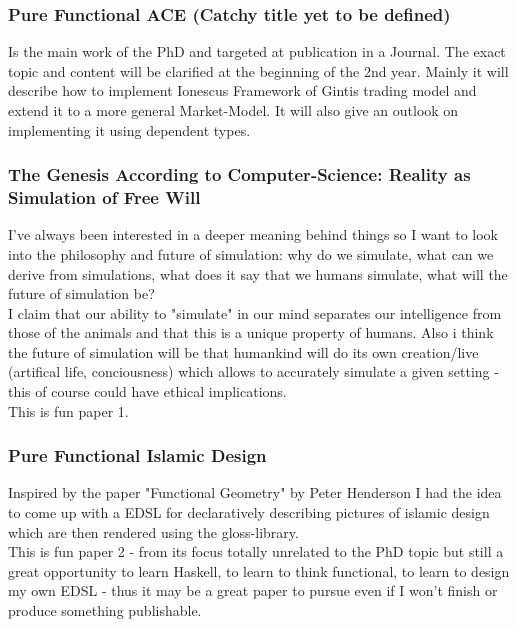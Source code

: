 \subsubsection{Pure Functional ACE (Catchy title yet to be defined)}
Is the main work of the PhD and targeted at publication in a Journal. The exact topic and content will be clarified at the beginning of the 2nd year. Mainly it will describe how to implement Ionescus Framework of Gintis trading model and extend it to a more general Market-Model. It will also give an outlook on implementing it using dependent types.

\subsubsection{The Genesis According to Computer-Science: Reality as Simulation of Free Will}
I've always been interested in a deeper meaning behind things so I want to look into the philosophy and future of simulation: why do we simulate, what can we derive from simulations, what does it say that we humans simulate, what will the future of simulation be? \\
I claim that our ability to "simulate" in our mind separates our intelligence from those of the animals and that this is a unique property of humans. Also i think the future of simulation will be that humankind will do its own creation/live (artifical life, conciousness) which allows to accurately simulate a given setting - this of course could have ethical implications. \\
This is fun paper 1.

\subsubsection{Pure Functional Islamic Design}
Inspired by the paper "Functional Geometry" by Peter Henderson I had the idea to come up with a  EDSL for declaratively describing pictures of islamic design which are then rendered using the gloss-library. \\
This is fun paper 2 - from its focus totally unrelated to the PhD topic but still a great opportunity to learn Haskell, to learn to think functional, to learn to design my own EDSL - thus it may be a great paper to pursue even if I won't finish or produce something publishable.